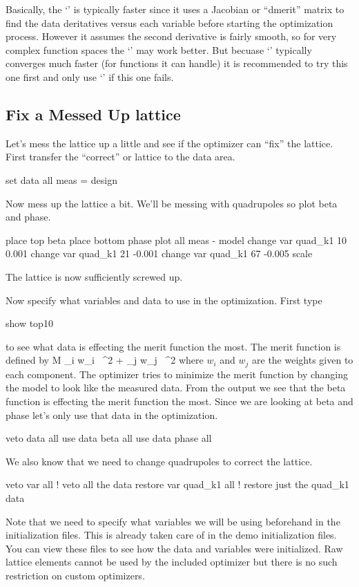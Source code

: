 Basically, the `' is typically faster since it uses a Jacobian or
``dmerit'' matrix to find the data deritatives versus each variable before
starting the optimization process.  However it assumes the second derivative is
fairly smooth, so for very complex function spaces the `' may work
better. But becuase `' typically converges much faster (for functions it
can handle) it is recommended to try this one first and only use `' if
this one fails. 

\subsection{Fix a Messed Up lattice}
\label{ss:fix_it}

Let's mess the lattice up a little and see if the optimizer can ``fix'' the
lattice. First transfer the ``correct'' or  lattice to the  data area.
\begin{example}
  set data all meas = design
\end{example}
Now mess up the lattice a bit. We'll be messing with quadrupoles so plot
beta and phase.
\begin{example}
  place top beta
  place bottom phase
  plot all meas - model
  change var quad\_k1 10 0.001
  change var quad\_k1 21 -0.001
  change var quad\_k1 67 -0.005
  scale
\end{example}
The lattice is now sufficiently screwed up.

Now specify what variables and data to use in the optimization. First type
\begin{example}
  show top10
\end{example}
to see what data is effecting the merit function the most. The merit function is
defined by
\Begineq
  {\cal M} \equiv \sum_{i} w_i \,
    ^2 + 
  \sum_{j} w_j \,
    ^2
  \label{eq:merit}
\Endeq
where $w_{i}$ and $w_{j}$ are the weights given to each component.
The optimizer tries to minimize the merit function by changing the model to look
like the measured data. From the  output we see that the beta function is effecting 
the merit function the most. Since we
are looking at beta and phase let's only use that data in the optimization.
\begin{example}
  veto data all
  use  data beta all
  use  data phase all
\end{example}
We also know that we need to change quadrupoles to correct the lattice.
\begin{example}
  veto var all         ! veto all the data
  restore var quad\_k1 all ! restore just the quad\_k1 data
\end{example}
Note that we need to specify what variables we will be using beforehand in the
initialization files. This is already taken care of in the demo initialization
files. You can view these files to see how the data and variables were
initialized. Raw lattice elements cannot be used by the included optimizer but
there is no such restriction on custom optimizers.

